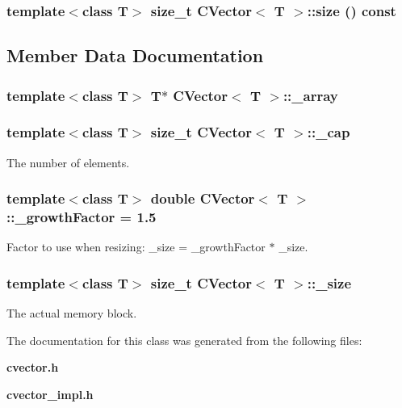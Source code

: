 \subsubsection{\setlength{\rightskip}{0pt plus 5cm}template$<$class T$>$ size\_\-t {\bf CVector}$<$ T $>$::size () const\hspace{0.3cm}{\tt  [inline]}}\label{classCVector_a13}




\subsection{Member Data Documentation}
\subsubsection{\setlength{\rightskip}{0pt plus 5cm}template$<$class T$>$ T$\ast$ {\bf CVector}$<$ T $>$::{\bf \_\-array}\hspace{0.3cm}{\tt  [protected]}}\label{classCVector_p0}


\subsubsection{\setlength{\rightskip}{0pt plus 5cm}template$<$class T$>$ size\_\-t {\bf CVector}$<$ T $>$::{\bf \_\-cap}\hspace{0.3cm}{\tt  [protected]}}\label{classCVector_p2}


The number of elements. 

\subsubsection{\setlength{\rightskip}{0pt plus 5cm}template$<$class T$>$ double {\bf CVector}$<$ T $>$::{\bf \_\-growth\-Factor} = 1.5\hspace{0.3cm}{\tt  [static]}}\label{classCVector_s0}


Factor to use when resizing: \_\-size = \_\-growth\-Factor $\ast$ \_\-size. 

\subsubsection{\setlength{\rightskip}{0pt plus 5cm}template$<$class T$>$ size\_\-t {\bf CVector}$<$ T $>$::{\bf \_\-size}\hspace{0.3cm}{\tt  [protected]}}\label{classCVector_p1}


The actual memory block. 



The documentation for this class was generated from the following files:\begin{CompactItemize}
\item 
{\bf cvector.h}\item 
{\bf cvector\_\-impl.h}\end{CompactItemize}
